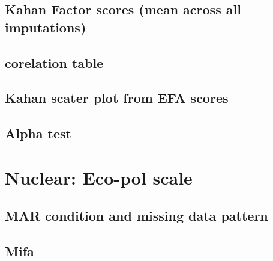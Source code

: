 \documentclass[
]{article}
\begin{document}
\hypertarget{kahan-factor-scores-mean-across-all-imputations}{%
\subsection{Kahan Factor scores (mean across all
imputations)}\label{kahan-factor-scores-mean-across-all-imputations}}

\hypertarget{corelation-table}{%
\subsection{corelation table}\label{corelation-table}}

\hypertarget{kahan-scater-plot-from-efa-scores}{%
\subsection{Kahan scater plot from EFA
scores}\label{kahan-scater-plot-from-efa-scores}}

\hypertarget{alpha-test}{%
\subsection{Alpha test}\label{alpha-test}}

\hypertarget{nuclear-eco-pol-scale}{%
\section{Nuclear: Eco-pol scale}\label{nuclear-eco-pol-scale}}

\hypertarget{mar-condition-and-missing-data-pattern-1}{%
\subsection{MAR condition and missing data
pattern}\label{mar-condition-and-missing-data-pattern-1}}

\hypertarget{mifa-1}{%
\subsection{Mifa}\label{mifa-1}}
\end{document}

